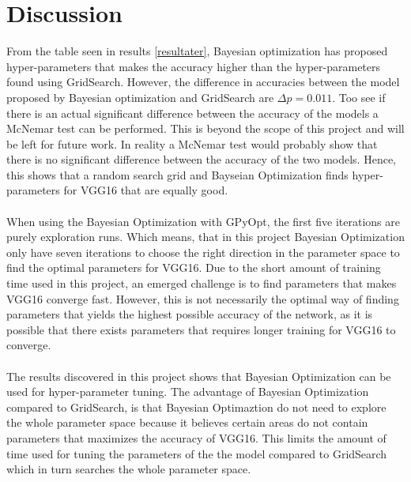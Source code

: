 \documentclass[12pt,fleqn]{article}
\begin{document}
\section{Discussion}

From the table seen in results \ref{resultater}, Bayesian optimization has proposed hyper-parameters that makes the accuracy higher than the hyper-parameters found using GridSearch. However, the difference in accuracies between the model proposed by Bayesian optimization and GridSearch are $ \Delta p = 0.011$. Too see if there is an actual significant difference between the accuracy of the models a McNemar test can be performed. This is beyond the scope of this project and will be left for future work. In reality a McNemar test would probably show that there is no significant difference between the accuracy of the two models. Hence, this shows that a random search grid and Bayseian Optimization finds hyper-parameters for VGG16 that are equally good.
\\\\
When using the Bayesian Optimization with GPyOpt, the first five iterations are purely exploration runs. Which means, that in this project Bayesian Optimization only have seven iterations to choose the right direction in the parameter space to find the optimal parameters for VGG16. Due to the short amount of training time used in this project, an emerged challenge is to find parameters that makes VGG16 converge fast. However, this is not necessarily the optimal way of finding parameters that yields the highest possible accuracy of the network, as it is possible that there exists parameters that requires longer training for VGG16 to converge.
\\\\
The results discovered in this project shows that Bayesian Optimization can be used for hyper-parameter tuning. The advantage of Bayesian Optimization compared to GridSearch, is that Bayesian Optimaztion do not need to explore the whole parameter space because it believes certain areas do not contain parameters that maximizes the accuracy of VGG16. This limits the amount of time used for tuning the parameters of the the model compared to GridSearch which in turn searches the whole parameter space.
\end{document}
